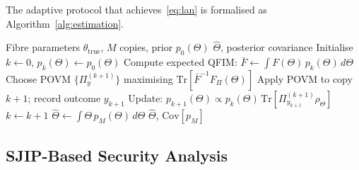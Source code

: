 \documentclass[journal,twocolumn]{IEEEtran}
\theoremstyle{definition}
\theoremstyle{plain}
\newcommand{\Tr}{\mathrm{Tr}}
\begin{document}
The adaptive protocol that achieves~\eqref{eq:lan} is formalised
as Algorithm~\ref{alg:estimation}.

\begin{algorithm}[t]
\caption{Adaptive Bayesian Channel Parameter Estimation}
\label{alg:estimation}
\begin{algorithmic}[1]
\Require Fibre parameters $\theta_{\mathrm{true}}$,\; $M$ copies,\;
         prior $p_0(\Theta)$
\Ensure $\hat\Theta$, posterior covariance
\State Initialise $k \leftarrow 0$,\; $p_k(\Theta) \leftarrow p_0(\Theta)$
  \State Compute expected QFIM:
         $\bar F \leftarrow \int F(\Theta)\,p_k(\Theta)\,d\Theta$
  \State Choose POVM $\{\Pi_y^{(k+1)}\}$ maximising
         $\Tr[\bar F^{-1} F_\Pi(\Theta)]$
  \State Apply POVM to copy $k+1$; record outcome $y_{k+1}$
  \State Update: $p_{k+1}(\Theta) \propto
         p_k(\Theta)\,\Tr[\Pi_{y_{k+1}}^{(k+1)} \rho_\Theta]$
  \State $k \leftarrow k + 1$
\EndWhile
\State $\hat\Theta \leftarrow \int\Theta\,p_M(\Theta)\,d\Theta$
\Return $\hat\Theta$,\; $\mathrm{Cov}[p_M]$
\end{algorithmic}
\end{algorithm}

\subsection{SJIP-Based Security Analysis}
\end{document}
